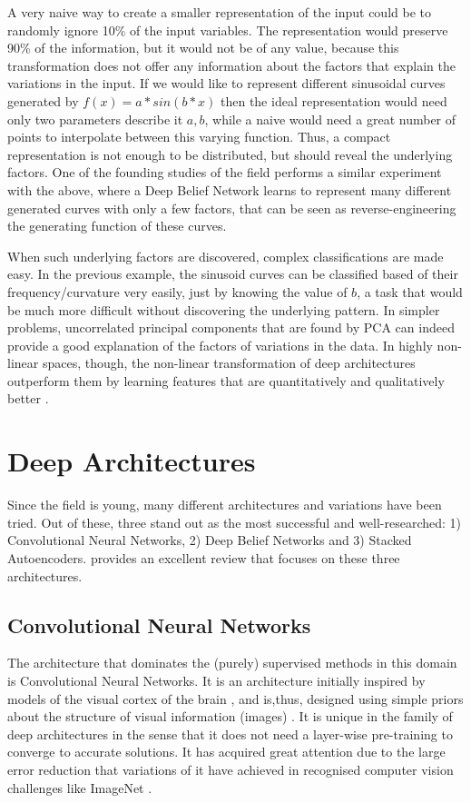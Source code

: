 \documentclass[a4paper]{article}
\begin{document}
		A very naive way to create a smaller representation of the input could be to randomly ignore 10\% of the input variables. The representation would preserve 90\% of the information, but it would not be of any value, because this transformation does not offer any information about the factors that explain the variations in the input. If we would like to represent different sinusoidal curves generated by $ f(x)=a*sin(b*x)$ then the ideal representation would need only two parameters describe it $a, b$, while a naive would need a great number of points to interpolate between this varying function. Thus, a compact representation is not enough to be distributed, but should reveal the underlying factors\cite{Bengio2013c}.	One of the founding studies of the field \cite{Hinton2006a} performs a similar experiment with the above, where a Deep Belief Network learns to represent many different generated curves with only a few factors, that can be seen as reverse-engineering the generating function of these curves. 
		
		When such underlying factors are discovered, complex classifications are made easy. In the previous example, the sinusoid curves can be classified based of their frequency/curvature very easily, just by knowing the value of $b$, a task that would be much more difficult without discovering the underlying pattern.
		In simpler problems, uncorrelated principal components that are found by PCA can indeed provide a good explanation of the factors of variations in the data. In highly non-linear spaces, though, the non-linear transformation of deep architectures outperform them by learning features that are quantitatively and qualitatively better \cite{Hinton2006}.	

	\section{Deep Architectures}
		Since the field is young, many different architectures and variations have been tried. Out of these, three stand out as the most successful and well-researched: 1) Convolutional Neural Networks, 2) Deep Belief Networks and 3) Stacked Autoencoders. \cite{Bengio2012} provides an excellent review that focuses on these three architectures.
		
		\subsection{Convolutional Neural Networks}
		\label{sec:CNN}			
		The architecture that dominates the (purely) supervised methods in this domain is Convolutional Neural Networks. It is an architecture initially inspired by models of the visual cortex of the brain \cite{Fukushima1980}, and is,thus, designed using simple priors about the structure of visual information (images) \cite{Bengio2013c}. It is unique in the family of deep architectures in the sense that it does not need a layer-wise pre-training to converge to accurate solutions. It has acquired great attention due to the large error reduction that variations of it have achieved in recognised computer vision challenges like ImageNet \cite{Deng2009a}. 
		
\end{document}
